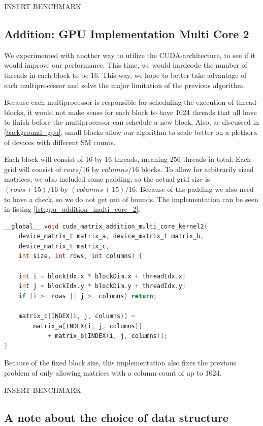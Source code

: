 INSERT BENCHMARK

\subsection{Addition: GPU Implementation Multi Core 2}
We experimented with another way to utilize the CUDA-architecture, to see if it would improve our performance. This time, we would hardcode the number of threads in each block to be 16. This way, we hope to better take advantage of each multiprocessor and solve the major limitation of the previous algorithm.

Because each multiprocessor is responsible for scheduling the execution of thread-blocks, it would not make sense for each block to have 1024 threads that all have to finish before the multiprocessor can schedule a new block. Also, as discussed in \ref{background_gpu}, small blocks allow our algorithm to scale better on a plethora of devices with different SM counts.

Each block will consist of 16 by 16 threads, meaning 256 threads in total. Each grid will consist of $rows / 16$ by $columns / 16$ blocks. To allow for arbitrarily sized matrices, we also included some padding, so the actual grid size is $(rows + 15) / 16$ by $(columns + 15) / 16$. Because of the padding we also need to have a check, so we do not get out of bounds. The implementation can be seen in listing \ref{lst:gpu_addition_multi_core_2}.

\begin{lstlisting}[language=C, caption={GPU addition multi core 2}, label={lst:gpu_addition_multi_core_2}]
__global__ void cuda_matrix_addition_multi_core_kernel2(
    device_matrix_t matrix_a, device_matrix_t matrix_b,
    device_matrix_t matrix_c, 
    int size, int rows, int columns) {
    
    int i = blockIdx.x * blockDim.x + threadIdx.x;
    int j = blockIdx.y * blockDim.y + threadIdx.y;
    if (i >= rows || j >= columns) return;

    matrix_c[INDEX(i, j, columns)] =
        matrix_a[INDEX(i, j, columns)] 
            + matrix_b[INDEX(i, j, columns)];
}
\end{lstlisting}

Because of the fixed block size, this implementation also fixes the previous problem of only allowing matrices with a column count of up to 1024.

INSERT BENCHMARK

\subsection{A note about the choice of data structure}

